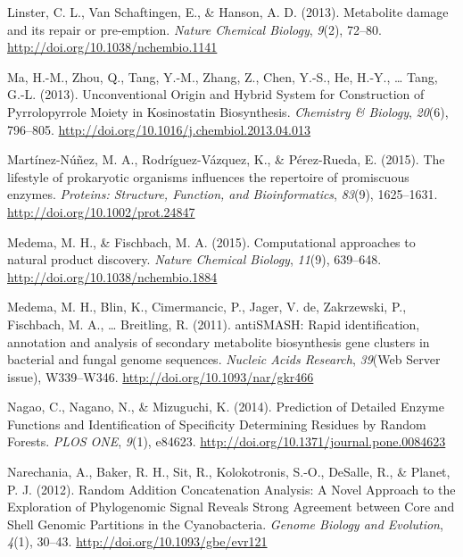 \documentclass[12pt,twoside]{reedthesis}
\begin{document}
  \hypertarget{ref-linsterux5fmetaboliteux5f2013}{}
  Linster, C. L., Van Schaftingen, E., \& Hanson, A. D. (2013). Metabolite
  damage and its repair or pre-emption. \emph{Nature Chemical Biology},
  \emph{9}(2), 72--80. \url{http://doi.org/10.1038/nchembio.1141}
  
  \hypertarget{ref-maux5funconventionalux5f2013}{}
  Ma, H.-M., Zhou, Q., Tang, Y.-M., Zhang, Z., Chen, Y.-S., He, H.-Y.,
  \ldots{} Tang, G.-L. (2013). Unconventional Origin and Hybrid System for
  Construction of Pyrrolopyrrole Moiety in Kosinostatin Biosynthesis.
  \emph{Chemistry \& Biology}, \emph{20}(6), 796--805.
  \url{http://doi.org/10.1016/j.chembiol.2013.04.013}
  
  \hypertarget{ref-martinez-nunezux5flifestyleux5f2015}{}
  Martínez-Núñez, M. A., Rodríguez-Vázquez, K., \& Pérez-Rueda, E. (2015).
  The lifestyle of prokaryotic organisms influences the repertoire of
  promiscuous enzymes. \emph{Proteins: Structure, Function, and
  Bioinformatics}, \emph{83}(9), 1625--1631.
  \url{http://doi.org/10.1002/prot.24847}
  
  \hypertarget{ref-medemaux5fcomputationalux5f2015}{}
  Medema, M. H., \& Fischbach, M. A. (2015). Computational approaches to
  natural product discovery. \emph{Nature Chemical Biology}, \emph{11}(9),
  639--648. \url{http://doi.org/10.1038/nchembio.1884}
  
  \hypertarget{ref-medemaux5fantismash:ux5f2011}{}
  Medema, M. H., Blin, K., Cimermancic, P., Jager, V. de, Zakrzewski, P.,
  Fischbach, M. A., \ldots{} Breitling, R. (2011). antiSMASH: Rapid
  identification, annotation and analysis of secondary metabolite
  biosynthesis gene clusters in bacterial and fungal genome sequences.
  \emph{Nucleic Acids Research}, \emph{39}(Web Server issue), W339--W346.
  \url{http://doi.org/10.1093/nar/gkr466}
  
  \hypertarget{ref-nagaoux5fpredictionux5f2014}{}
  Nagao, C., Nagano, N., \& Mizuguchi, K. (2014). Prediction of Detailed
  Enzyme Functions and Identification of Specificity Determining Residues
  by Random Forests. \emph{PLOS ONE}, \emph{9}(1), e84623.
  \url{http://doi.org/10.1371/journal.pone.0084623}
  
  \hypertarget{ref-narechaniaux5frandomux5f2012}{}
  Narechania, A., Baker, R. H., Sit, R., Kolokotronis, S.-O., DeSalle, R.,
  \& Planet, P. J. (2012). Random Addition Concatenation Analysis: A Novel
  Approach to the Exploration of Phylogenomic Signal Reveals Strong
  Agreement between Core and Shell Genomic Partitions in the
  Cyanobacteria. \emph{Genome Biology and Evolution}, \emph{4}(1), 30--43.
  \url{http://doi.org/10.1093/gbe/evr121}
  
\end{document}
